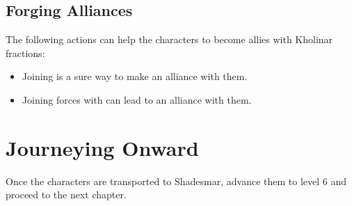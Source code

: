 \newpage
\subsection{Forging Alliances}

The following actions can help the characters to become allies with Kholinar fractions:
\begin{itemize}
	\item Joining \npcFractionCult{} is a sure way to make an alliance with them.
	\item Joining forces with \npcFractionCrime{} can lead to an alliance with them.
\end{itemize}




\newpage



\section{Journeying Onward}

Once the characters are transported to Shadesmar, advance them to level 6 and proceed to the next chapter.